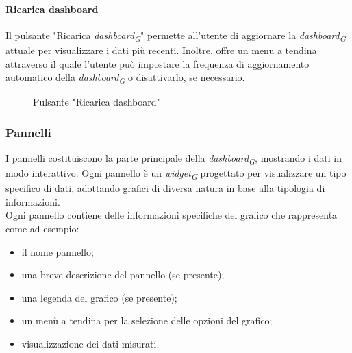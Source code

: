 \paragraph{Ricarica dashboard}
Il pulsante "Ricarica \textit{dashboard}\textsubscript{\textit{G}}" permette all'utente di aggiornare la \textit{dashboard}\textsubscript{\textit{G}} attuale per visualizzare i dati più recenti.  Inoltre, offre un menu a tendina attraverso il quale l'utente può impostare la frequenza di aggiornamento automatico della \textit{dashboard}\textsubscript{\textit{G}} o disattivarlo, se necessario.  
\begin{figure}[H]
    \centering
    \caption{Pulsante "Ricarica dashboard"}
    \label{fig:my_label}
\end{figure}

\subsubsection{Pannelli}
I pannelli costituiscono la parte principale della \textit{dashboard}\textsubscript{\textit{G}}, mostrando i dati in modo interattivo. Ogni pannello è un \textit{widget}\textsubscript{\textit{G}} progettato per visualizzare un tipo specifico di dati, adottando grafici di diversa natura in base alla tipologia di informazioni. \\
Ogni pannello contiene delle informazioni specifiche del grafico che rappresenta come ad esempio:
\begin{itemize}
    \item il nome pannello;
    \item una breve descrizione del pannello (se presente);
    \item una legenda del grafico (se presente);
    \item un menù a tendina per la selezione delle opzioni del grafico;
    \item visualizzazione dei dati misurati.
\end{itemize}

